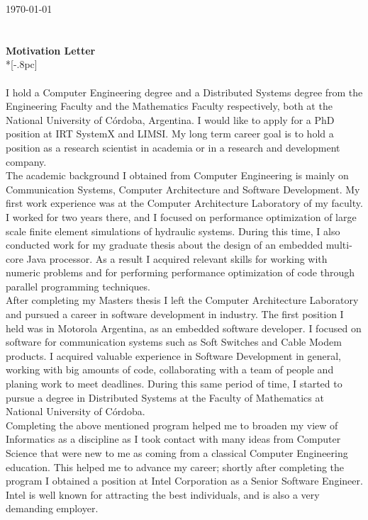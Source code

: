 \documentclass[letter,12pt,english]{article}
\begin{document}
{ \hfill \today \\ \\ 

\\
\large
\bf Motivation Letter} \\*[-.8pc]
\\
\\
I hold a Computer Engineering degree and a Distributed Systems degree from the Engineering Faculty
and the Mathematics Faculty respectively, both at the National University of C\'ordoba, Argentina.
I would like to apply for a PhD position at IRT SystemX and LIMSI. My long term career goal is to hold a position as a research scientist in academia or in a research and development company.
\\
The academic background I obtained from Computer Engineering is mainly on Communication Systems,
Computer Architecture and Software Development. My first work experience was at the Computer 
Architecture Laboratory of my faculty. I worked for two years there, and I focused on performance
optimization of large scale finite element simulations of hydraulic systems. During this time, I 
also conducted work for my graduate thesis about the design of an embedded multi-core Java processor.
As a result I acquired relevant skills for working with numeric problems and for
performing performance optimization of code through parallel programming techniques.
\\
After completing my Masters thesis I left the Computer Architecture Laboratory and pursued a career
in software development in industry. The first position I held was in Motorola Argentina, as an embedded
software developer. I focused on software for communication systems such as Soft Switches and Cable Modem
products. I acquired valuable experience in Software Development in general, working with big amounts of
code, collaborating with a team of people and planing work to meet deadlines. During this same period of 
time, I started to pursue a degree in Distributed Systems at the Faculty of Mathematics at National 
University of C\'ordoba.
\\
Completing the above mentioned program helped me to broaden my view of Informatics as a discipline
as I took contact with many ideas from Computer Science that were new to me as coming from a classical 
Computer Engineering education. This helped me to advance my career; shortly after completing 
the program I obtained a position at Intel Corporation as a Senior Software Engineer. 
Intel is well known for attracting the best individuals, and is also a very demanding employer.
\end{document}
